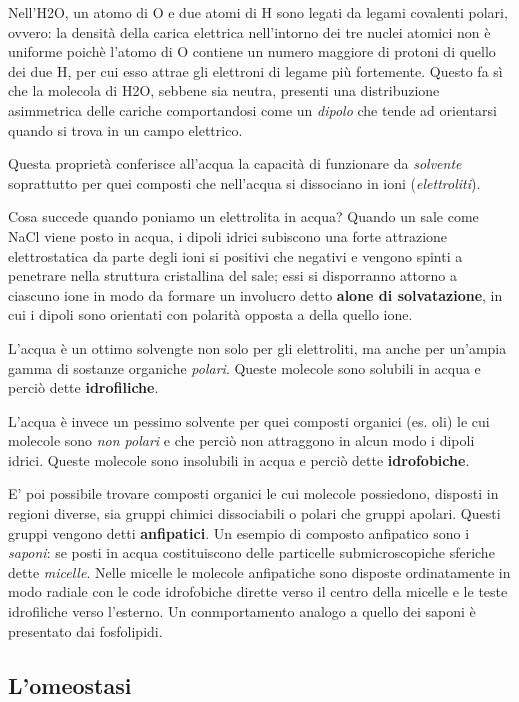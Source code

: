\documentclass[]{article}
\begin{document}
Nell'H2O, un atomo di O e due atomi di H sono legati da legami covalenti
polari, ovvero: la densità della carica elettrica nell'intorno dei tre
nuclei atomici non è uniforme poichè l'atomo di O contiene un numero
maggiore di protoni di quello dei due H, per cui esso attrae gli
elettroni di legame più fortemente. Questo fa sì che la molecola di H2O,
sebbene sia neutra, presenti una distribuzione asimmetrica delle cariche
comportandosi come un \emph{dipolo} che tende ad orientarsi quando si
trova in un campo elettrico.

Questa proprietà conferisce all'acqua la capacità di funzionare da
\emph{solvente} soprattutto per quei composti che nell'acqua si
dissociano in ioni (\emph{elettroliti}).

Cosa succede quando poniamo un elettrolita in acqua? Quando un sale come
NaCl viene posto in acqua, i dipoli idrici subiscono una forte
attrazione elettrostatica da parte degli ioni si positivi che negativi e
vengono spinti a penetrare nella struttura cristallina del sale; essi si
disporranno attorno a ciascuno ione in modo da formare un involucro
detto \textbf{alone di solvatazione}, in cui i dipoli sono orientati con
polarità opposta a della quello ione.

L'acqua è un ottimo solvengte non solo per gli elettroliti, ma anche per
un'ampia gamma di sostanze organiche \emph{polari}. Queste molecole sono
solubili in acqua e perciò dette \textbf{idrofiliche}.

L'acqua è invece un pessimo solvente per quei composti organici (es.
oli) le cui molecole sono \emph{non polari} e che perciò non attraggono
in alcun modo i dipoli idrici. Queste molecole sono insolubili in acqua
e perciò dette \textbf{idrofobiche}.

E' poi possibile trovare composti organici le cui molecole possiedono,
disposti in regioni diverse, sia gruppi chimici dissociabili o polari
che gruppi apolari. Questi gruppi vengono detti \textbf{anfipatici}. Un
esempio di composto anfipatico sono i \emph{saponi}: se posti in acqua
costituiscono delle particelle submicroscopiche sferiche dette
\emph{micelle}. Nelle micelle le molecole anfipatiche sono disposte
ordinatamente in modo radiale con le code idrofobiche dirette verso il
centro della micelle e le teste idrofiliche verso l'esterno. Un
conmportamento analogo a quello dei saponi è presentato dai fosfolipidi.

\subsection{L'omeostasi}\label{lomeostasi}
\end{document}
